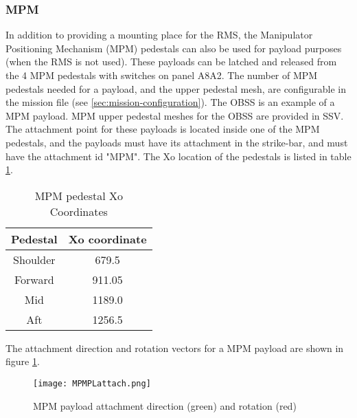 \documentclass[Space_Shuttle_Vessel_Manual.tex]{subfiles}
\begin{document}
\begin{multicols*}{2}
\subsubsection{MPM}
In addition to providing a mounting place for the RMS, the Manipulator Positioning Mechanism (MPM) pedestals can also be used for payload purposes (when the RMS is not used). These payloads can be latched and released from the 4 MPM pedestals with switches on panel A8A2.
The number of MPM pedestals needed for a payload, and the upper pedestal mesh, are configurable in the mission file (see \ref{sec:mission-configuration}). The OBSS is an example of a MPM payload. MPM upper pedestal meshes for the OBSS are provided in SSV.\\
The attachment point for these payloads is located inside one of the MPM pedestals, and the payloads must have its attachment in the strike-bar, and must have the attachment id "MPM". The Xo location of the pedestals is listed in table \ref{tab:MPMCoordinates}.

\begin{table}[H]
  \centering
  \begin{tabularx}{125pt}{c | c}
    \textbf{Pedestal} & \textbf{Xo coordinate} \\
    \hline
    Shoulder & 679.5 \\
    Forward & 911.05 \\
    Mid & 1189.0 \\
    Aft & 1256.5
  \end{tabularx}
  \caption{MPM pedestal Xo Coordinates}
  \label{tab:MPMCoordinates}
\end{table}

\noindent
The attachment direction and rotation vectors for a MPM payload are shown in figure \ref{fig:MPMPLattach}.
\begin{figure}[H]
  \centering
  \captionsetup{justification=centering}
  \texttt{[image: MPMPLattach.png]}
  \caption{MPM payload attachment direction (green) and rotation (red)}
  \label{fig:MPMPLattach}
\end{figure}



\end{multicols*}
\end{document}
